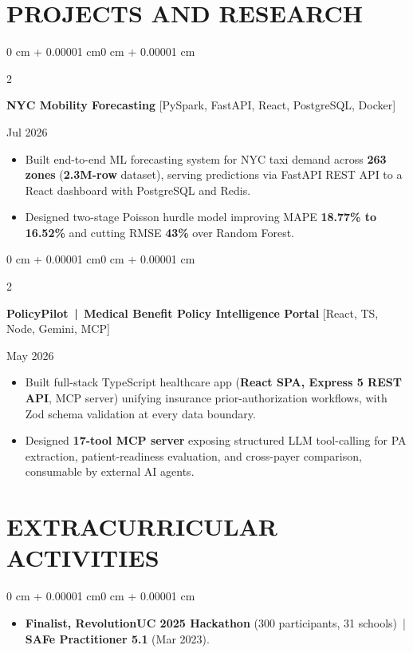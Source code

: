 \documentclass[10pt, letterpaper]{article}
\newenvironment{highlights}{
    \begin{itemize}[
        topsep=0.10 cm,
        parsep=0.06 cm,
        partopsep=0pt,
        itemsep=0.06 cm,
        leftmargin=12pt
    ]
}{
    \end{itemize}
}
\newenvironment{onecolentry}{
    \begin{adjustwidth}{0 cm + 0.00001 cm}{0 cm + 0.00001 cm}
}{
    \end{adjustwidth}
}
\newenvironment{twocolentry}[2][]{
    \onecolentry
    \def\secondColumn{#2}
    \setcolumnwidth{\fill, 4.5 cm}
    \begin{paracol}{2}
}{
    \switchcolumn \raggedleft \secondColumn
    \end{paracol}
    \endonecolentry
}
\begin{document}
\section{PROJECTS AND RESEARCH}
\begin{twocolentry}{Jul 2026}
\textbf{NYC Mobility Forecasting} [PySpark, FastAPI, React, PostgreSQL, Docker]
\end{twocolentry}
\begin{highlights}
  \item Built end-to-end ML forecasting system for NYC taxi demand across \textbf{263 zones} (\textbf{2.3M-row} dataset), serving predictions via FastAPI REST API to a React dashboard with PostgreSQL and Redis.
  \item Designed two-stage Poisson hurdle model improving MAPE \textbf{18.77\% to 16.52\%} and cutting RMSE \textbf{43\%} over Random Forest.
\end{highlights}

\vspace{0.12 cm}

\begin{twocolentry}{May 2026}
\textbf{PolicyPilot \,|\, Medical Benefit Policy Intelligence Portal} [React, TS, Node, Gemini, MCP]
\end{twocolentry}
\begin{highlights}
  \item Built full-stack TypeScript healthcare app (\textbf{React SPA, Express 5 REST API}, MCP server) unifying insurance prior-authorization workflows, with Zod schema validation at every data boundary.
  \item Designed \textbf{17-tool MCP server} exposing structured LLM tool-calling for PA extraction, patient-readiness evaluation, and cross-payer comparison, consumable by external AI agents.
\end{highlights}

\section{EXTRACURRICULAR ACTIVITIES}
\begin{onecolentry}
\begin{highlights}
  \item \textbf{Finalist, RevolutionUC 2025 Hackathon} (300 participants, 31 schools) \,|\, \textbf{SAFe Practitioner 5.1} (Mar 2023).
\end{highlights}
\end{onecolentry}
\end{document}
